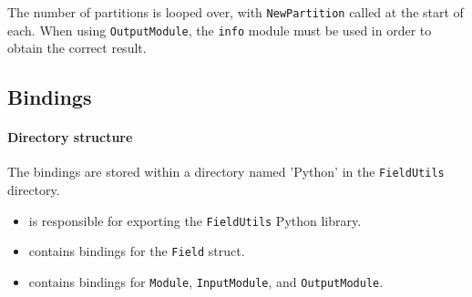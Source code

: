 The number of partitions is looped over, with \verb+NewPartition+ called at
the start of each. When using \verb+OutputModule+, the \verb+info+ module
must be used in order to obtain the correct result.

\subsection{Bindings}

\paragraph{Directory structure}


The bindings are stored within a directory named 'Python' in the
\texttt{FieldUtils} directory.

\begin{itemize}
    \item {} is responsible for
		  exporting the \verb+FieldUtils+ Python library.
    \item {} contains bindings for the \verb+Field+ struct.
    \item {} contains bindings for \verb+Module+,
	      \verb+InputModule+, and \verb+OutputModule+.
\end{itemize}
